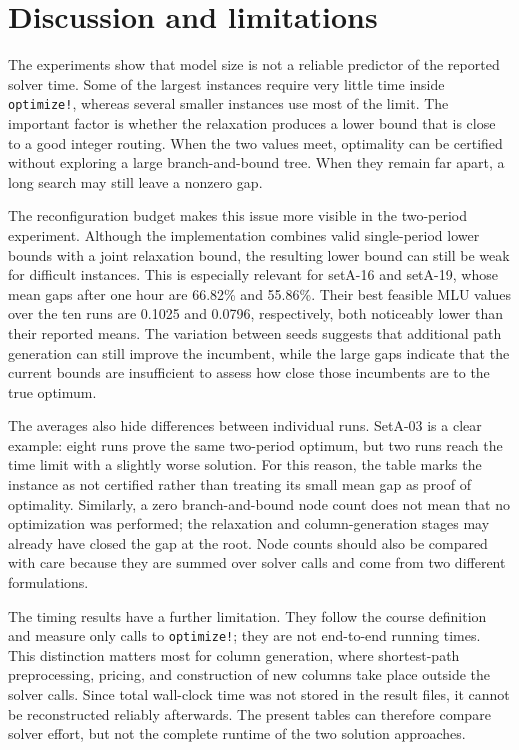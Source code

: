 \section{Discussion and limitations}
\label{sec:discussion}

The experiments show that model size is not a reliable predictor of the reported solver time. Some of
the largest instances require very little time inside \texttt{optimize!}, whereas several smaller
instances use most of the limit. The important factor is whether the relaxation produces a lower bound
that is close to a good integer routing. When the two values meet, optimality can be certified without
exploring a large branch-and-bound tree. When they remain far apart, a long search may still leave a
nonzero gap.

The reconfiguration budget makes this issue more visible in the two-period experiment. Although the
implementation combines valid single-period lower bounds with a joint relaxation bound, the resulting
lower bound can still be weak for difficult instances. This is especially relevant for setA-16 and
setA-19, whose mean gaps after one hour are 66.82\% and 55.86\%. Their best feasible MLU values over
the ten runs are 0.1025 and 0.0796, respectively, both noticeably lower than their reported means. The
variation between seeds suggests that additional path generation can still improve the incumbent,
while the large gaps indicate that the current bounds are insufficient to assess how close those
incumbents are to the true optimum.

The averages also hide differences between individual runs. SetA-03 is a clear example: eight runs
prove the same two-period optimum, but two runs reach the time limit with a slightly worse solution.
For this reason, the table marks the instance as not certified rather than treating its small mean gap
as proof of optimality. Similarly, a zero branch-and-bound node count does not mean that no
optimization was performed; the relaxation and column-generation stages may already have closed the
gap at the root. Node counts should also be compared with care because they are summed over solver
calls and come from two different formulations.

The timing results have a further limitation. They follow the course definition and measure only
calls to \texttt{optimize!}; they are not end-to-end running times. This distinction matters most for
column generation, where shortest-path preprocessing, pricing, and construction of new columns take
place outside the solver calls. Since total wall-clock time was not stored in the result files, it
cannot be reconstructed reliably afterwards. The present tables can therefore compare solver effort,
but not the complete runtime of the two solution approaches.

